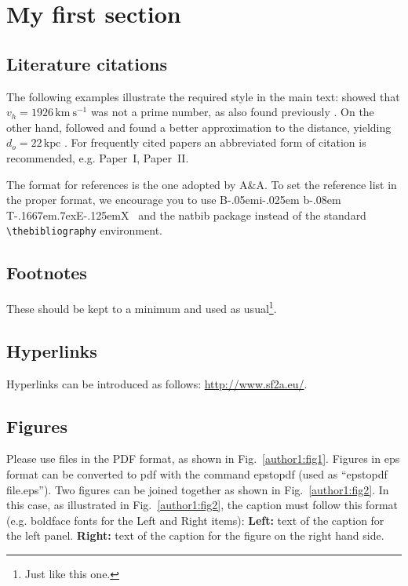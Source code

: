 \documentclass{sf2a-conf2022}
\def\BibTeX{{\rm B\kern-.05em{\sc i\kern-.025em b}\kern-.08em
    T\kern-.1667em\lower.7ex\hbox{E}\kern-.125emX}}
\newcommand{\kms}{{\mathrm{km~s^{-1}}}}
\newcommand{\kpc}{{\mathrm{kpc}}}
\begin{document}
\section{My first section}


\subsection{ Literature citations}
 
The following examples illustrate the required style in the main text:
 \cite{Einstein26} showed that $v_h = 1926 \, \kms$ was not a prime number, as
 also found previously \citep{Laurel24}. On the other hand, 
  \citet{1945RvMP...17..120E} followed 
\citet{Kafka24} and found a better approximation to the
distance, yielding $d_o = 22 \, \kpc$ \citep[see also][and references therein]{Bohr26,Curie91,deGaulle96}. 
For frequently cited papers an abbreviated form of citation is
 recommended, e.g. Paper~I, Paper~II.

The format for references is the one adopted by A\&A. To set the reference list in the proper format, we encourage you to use \BibTeX~ and the natbib package instead of the standard \verb=\thebibliography= environment.

\subsection{Footnotes}

These should be kept to a minimum and used as 
usual\footnote{Just like this one.}.


\subsection{Hyperlinks}

Hyperlinks can be introduced as follows: \url{http://www.sf2a.eu/}.

\subsection{Figures}

Please use files in the PDF format, as shown in Fig.~\ref{author1:fig1}. Figures in eps format can be converted to pdf with the command epstopdf (used as ``epstopdf file.eps''). Two figures can be joined together as shown in Fig.~\ref{author1:fig2}. In this case, as illustrated in Fig.~\ref{author1:fig2}, 
the caption must follow this format (e.g. boldface fonts for the Left and Right items): \textbf{Left:} text
of the caption for the left panel. \textbf{Right:} text of the caption for the figure on the right hand side. 
\end{document}

